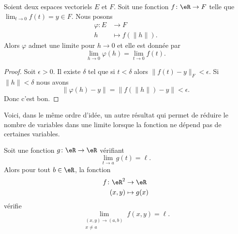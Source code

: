 \begin{lemma}
	Soient deux espaces vectoriels \( E\) et \( F\). Soit une fonction \( f\colon \eR\to F\) telle que \( \lim_{t\to 0} f(t)=y\in F\). Nous posons
	\begin{equation}
		\begin{aligned}
			\varphi\colon E & \to F               \\
			h               & \mapsto f(\| h \|).
		\end{aligned}
	\end{equation}
	Alors \( \varphi\) admet une limite pour \( h\to 0\) et elle est donnée par
	\begin{equation}
		\lim_{h\to 0} \varphi(h)=\lim_{t\to 0} f(t).
	\end{equation}
\end{lemma}

\begin{proof}
	Soit \( \epsilon>0\). Il existe \( \delta\) tel que si \( t<\delta\) alors \( \| f(t)-y \|_F<\epsilon\). Si \( \| h \|<\delta\) nous avons
	\begin{equation}
		\| \varphi(h)-y \|=\| f(\| h \|)-y \|<\epsilon.
	\end{equation}
	Donc c'est bon.
\end{proof}

Voici, dans le même ordre d'idée, un autre résultat qui permet de réduire le nombre de variables dans une limite lorsque la fonction ne dépend pas de certaines variables.

\begin{lemma}        \label{LEMooYLIHooFBQyzC}
	Soit une fonction \( g\colon \eR\to \eR\) vérifiant
	\begin{equation}
		\lim_{t\to a} g(t)=\ell.
	\end{equation}
    Alors pour tout \( b\in \eR\), la fonction
	\begin{equation}
		\begin{aligned}
			f\colon \eR^2 & \to \eR      \\
			(x,y)         & \mapsto g(x)
		\end{aligned}
	\end{equation}
	vérifie
	\begin{equation}
		\lim_{\substack{(x,y)\to(a,b)\\x\neq a}} f(x,y)=\ell.
	\end{equation}
\end{lemma}

